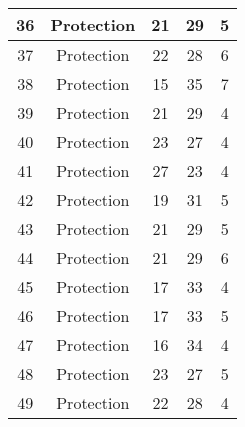 \documentclass[results.tex]{subfiles}
\begin{document}
\begin{center}
\begin{tabular}{| c || c | c | c | c |}
            \hline
            36                      & Protection                   & 21                     & 29                      & 5                    \\
            \hline
            37                      & Protection                   & 22                     & 28                      & 6                    \\
            \hline
            38                      & Protection                   & 15                     & 35                      & 7                    \\
            \hline
            39                      & Protection                   & 21                     & 29                      & 4                    \\
            \hline
            40                      & Protection                   & 23                     & 27                      & 4                    \\
            \hline
            41                      & Protection                   & 27                     & 23                      & 4                    \\
            \hline
            42                      & Protection                   & 19                     & 31                      & 5                    \\
            \hline
            43                      & Protection                   & 21                     & 29                      & 5                    \\
            \hline
            44                      & Protection                   & 21                     & 29                      & 6                    \\
            \hline
            45                      & Protection                   & 17                     & 33                      & 4                    \\
            \hline
            46                      & Protection                   & 17                     & 33                      & 5                    \\
            \hline
            47                      & Protection                   & 16                     & 34                      & 4                    \\
            \hline
            48                      & Protection                   & 23                     & 27                      & 5                    \\
            \hline
            49                      & Protection                   & 22                     & 28                      & 4                    \\
            \hline
        \end{tabular}
    \end{center}
\end{document}
